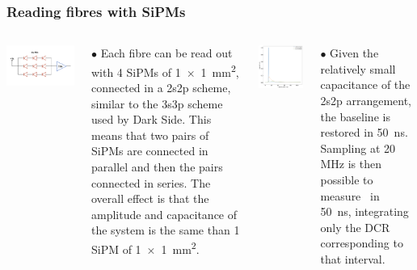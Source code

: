 \begin{frame}
\frametitle{Reading fibres with SiPMs}
\begin{columns}

\includegraphics[scale=0.5]{img/3s3p.png}

$\bullet$ Each fibre can be read out with 4 SiPMs of \SI{1 x 1}{mm^2}, connected in a 2s2p scheme, similar to the 3s3p scheme used by Dark Side. This means that two pairs of SiPMs are connected in parallel and then the pairs connected in series. The overall effect is that the amplitude and capacitance of the system is the same than 1 SiPM of \SI{1 x 1}{mm^2}.
  
 
\includegraphics[scale=0.2]{img/sipmResponse2s2p.png}

$\bullet$ Given the relatively small capacitance of the 2s2p arrangement, the baseline is restored in \SI{50}{ns}. Sampling at 20 MHz is then possible to measure \sone\ in \SI{50}{ns}, integrating only the DCR corresponding to that interval. 

\end{columns}
\end{frame}

